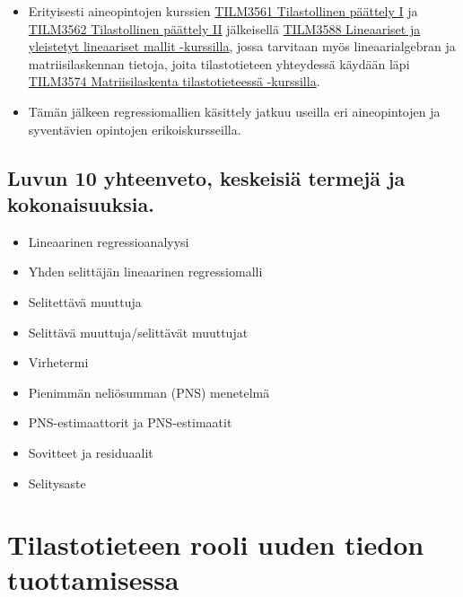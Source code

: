 \documentclass[
]{book}
\providecommand{\tightlist}{%
  \setlength{\itemsep}{0pt}\setlength{\parskip}{0pt}}
\begin{document}
\begin{itemize}
  \begin{itemize}
  \tightlist
  \item
    Erityisesti aineopintojen kurssien \href{https://opas.peppi.utu.fi/fi/opintojakso/TILM3561/5069}{TILM3561 Tilastollinen päättely I} ja \href{https://opas.peppi.utu.fi/fi/opintojakso/TILM3562/5070}{TILM3562 Tilastollinen päättely II} jälkeisellä \href{https://opas.peppi.utu.fi/fi/opintojakso/TILM3588/5071}{TILM3588 Lineaariset ja yleistetyt lineaariset mallit -kurssilla}, jossa tarvitaan myös lineaarialgebran ja matriisilaskennan tietoja, joita tilastotieteen yhteydessä käydään läpi \href{https://opas.peppi.utu.fi/fi/opintojakso/TILM3574/5082}{TILM3574 Matriisilaskenta tilastotieteessä -kurssilla}.
  \item
    Tämän jälkeen regressiomallien käsittely jatkuu useilla eri aineopintojen ja syventävien opintojen erikoiskursseilla.
  \end{itemize}
\end{itemize}

\hypertarget{luvun-10-yhteenveto-keskeisiuxe4-termejuxe4-ja-kokonaisuuksia.}{%
\section{Luvun 10 yhteenveto, keskeisiä termejä ja kokonaisuuksia.}\label{luvun-10-yhteenveto-keskeisiuxe4-termejuxe4-ja-kokonaisuuksia.}}

\begin{itemize}
\tightlist
\item
  Lineaarinen regressioanalyysi
\item
  Yhden selittäjän lineaarinen regressiomalli
\item
  Selitettävä muuttuja
\item
  Selittävä muuttuja/selittävät muuttujat
\item
  Virhetermi
\item
  Pienimmän neliösumman (PNS) menetelmä
\item
  PNS-estimaattorit ja PNS-estimaatit
\item
  Sovitteet ja residuaalit
\item
  Selitysaste
\end{itemize}


\hypertarget{luku11}{%
\chapter{Tilastotieteen rooli uuden tiedon tuottamisessa}\label{luku11}}
\end{document}
